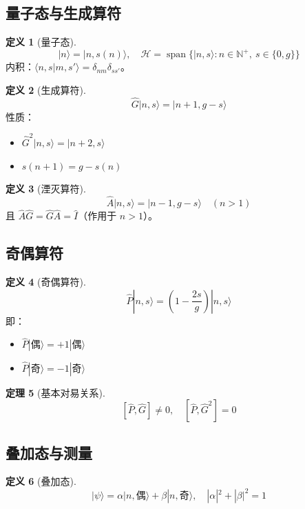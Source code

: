 \documentclass[12pt]{article}
\newtheorem{theorem}{定理}[section]
\theoremstyle{definition}
\newtheorem{definition}[theorem]{定义}
\newcommand{\N}{\mathbb{N}}
\begin{document}
\subsection{量子态与生成算符}

\begin{definition}[量子态]
\[
|n\rangle = |n, s(n)\rangle, \quad \mathcal{H} = \operatorname{span}\{|n,s\rangle : n \in \N^+,\ s \in \{0,g\}\}
\]
内积：\(\langle n,s | m,s' \rangle = \delta_{nm}\delta_{ss'}\)。
\end{definition}

\begin{definition}[生成算符]
\[
\hat{G}|n,s\rangle = |n+1, g-s\rangle
\]
性质：
\begin{itemize}
    \item \(\hat{G}^2|n,s\rangle = |n+2, s\rangle\)
    \item \(s(n+1) = g - s(n)\)
\end{itemize}
\end{definition}

\begin{definition}[湮灭算符]
\[
\hat{A}|n,s\rangle = |n-1, g-s\rangle \quad (n>1)
\]
且 \(\hat{A}\hat{G} = \hat{G}\hat{A} = \hat{I}\)（作用于 \(n>1\)）。
\end{definition}

\subsection{奇偶算符}

\begin{definition}[奇偶算符]
\[
\hat{P}|n,s\rangle = \left(1 - \frac{2s}{g}\right)|n,s\rangle
\]
即：
\begin{itemize}
    \item \(\hat{P}|\text{偶}\rangle = +1|\text{偶}\rangle\)
    \item \(\hat{P}|\text{奇}\rangle = -1|\text{奇}\rangle\)
\end{itemize}
\end{definition}

\begin{theorem}[基本对易关系]
\[
[\hat{P}, \hat{G}] \neq 0,\quad [\hat{P}, \hat{G}^2] = 0
\]
\end{theorem}

\subsection{叠加态与测量}

\begin{definition}[叠加态]
\[
|\psi\rangle = \alpha|n,\text{偶}\rangle + \beta|n,\text{奇}\rangle,\quad |\alpha|^2 + |\beta|^2 = 1
\]
\end{definition}
\end{document}
